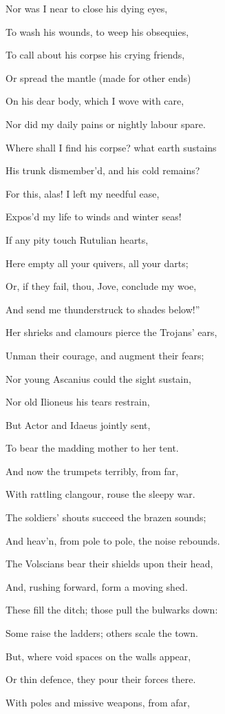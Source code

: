 Nor was I near to close his dying eyes,

To wash his wounds, to weep his obsequies,

To call about his corpse his crying friends,

Or spread the mantle (made for other ends)

On his dear body, which I wove with care,

Nor did my daily pains or nightly labour spare.

Where shall I find his corpse? what earth sustains

His trunk dismember’d, and his cold remains?

For this, alas! I left my needful ease,

Expos’d my life to winds and winter seas!

If any pity touch Rutulian hearts,

Here empty all your quivers, all your darts;

Or, if they fail, thou, Jove, conclude my woe,

And send me thunderstruck to shades below!”

Her shrieks and clamours pierce the Trojans’ ears,

Unman their courage, and augment their fears;

Nor young Ascanius could the sight sustain,

Nor old Ilioneus his tears restrain,

But Actor and Idaeus jointly sent,

To bear the madding mother to her tent.

And now the trumpets terribly, from far,

With rattling clangour, rouse the sleepy war.

The soldiers’ shouts succeed the brazen sounds;

And heav’n, from pole to pole, the noise rebounds.

The Volscians bear their shields upon their head,

And, rushing forward, form a moving shed.

These fill the ditch; those pull the bulwarks down:

Some raise the ladders; others scale the town.

But, where void spaces on the walls appear,

Or thin defence, they pour their forces there.

With poles and missive weapons, from afar,

